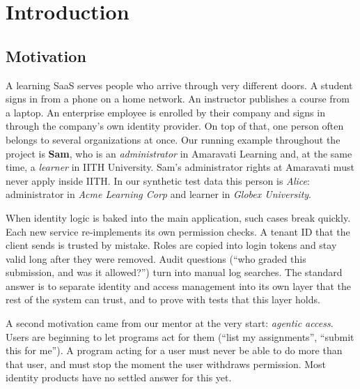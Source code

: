 \section{Introduction}
\label{sec:intro}

\subsection{Motivation}
A learning SaaS serves people who arrive through very different doors. A student signs in from a phone on a home network. An instructor publishes a course from a laptop. An enterprise employee is enrolled by their company and signs in through the company's own identity provider. On top of that, one person often belongs to several organizations at once. Our running example throughout the project is \textbf{Sam}, who is an \emph{administrator} in Amaravati Learning and, at the same time, a \emph{learner} in IITH University. Sam's administrator rights at Amaravati must never apply inside IITH. In our synthetic test data this person is \emph{Alice}: administrator in \emph{Acme Learning Corp} and learner in \emph{Globex University}.

When identity logic is baked into the main application, such cases break quickly. Each new service re-implements its own permission checks. A tenant ID that the client sends is trusted by mistake. Roles are copied into login tokens and stay valid long after they were removed. Audit questions (``who graded this submission, and was it allowed?'') turn into manual log searches. The standard answer is to separate identity and access management into its own layer that the rest of the system can trust, and to prove with tests that this layer holds.

A second motivation came from our mentor at the very start: \emph{agentic access}. Users are beginning to let programs act for them (``list my assignments'', ``submit this for me''). A program acting for a user must never be able to do more than that user, and must stop the moment the user withdraws permission. Most identity products have no settled answer for this yet.

